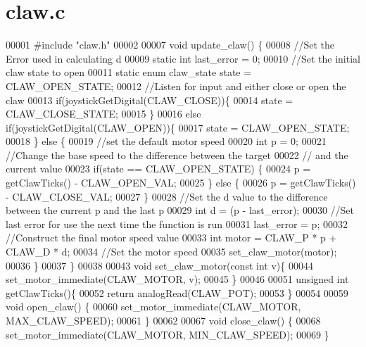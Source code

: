 \section{claw.\+c}
\label{claw_8c_source}

\begin{DoxyCode}
00001 \textcolor{preprocessor}{#include "claw.h"}
00002 
00007 \textcolor{keywordtype}{void} update_claw() \{
00008   \textcolor{comment}{//Set the Error used in calculating d}
00009   \textcolor{keyword}{static} \textcolor{keywordtype}{int} last\_error = 0;
00010   \textcolor{comment}{//Set the initial claw state to open}
00011   \textcolor{keyword}{static} \textcolor{keyword}{enum} claw_state state = CLAW_OPEN_STATE;
00012   \textcolor{comment}{//Listen for input and either close or open the claw}
00013   \textcolor{keywordflow}{if}(joystickGetDigital(CLAW_CLOSE))\{
00014     state = CLAW_CLOSE_STATE;
00015   \}
00016   \textcolor{keywordflow}{else} \textcolor{keywordflow}{if}(joystickGetDigital(CLAW_OPEN))\{
00017     state = CLAW_OPEN_STATE;
00018   \} \textcolor{keywordflow}{else} \{
00019     \textcolor{comment}{//set the default motor speed}
00020     \textcolor{keywordtype}{int} p = 0;
00021     \textcolor{comment}{//Change the base speed to the difference between the target}
00022     \textcolor{comment}{// and the current value}
00023     \textcolor{keywordflow}{if}(state == CLAW_OPEN_STATE) \{
00024       p = getClawTicks() - CLAW_OPEN_VAL;
00025     \} \textcolor{keywordflow}{else} \{
00026       p = getClawTicks() - CLAW_CLOSE_VAL;
00027     \}
00028     \textcolor{comment}{//Set the d value to the difference between the current p and the last p}
00029     \textcolor{keywordtype}{int} d = (p - last\_error);
00030     \textcolor{comment}{//Set last error for use the next time the function is run}
00031     last\_error = p;
00032     \textcolor{comment}{//Construct the final motor speed value}
00033     \textcolor{keywordtype}{int} motor = CLAW_P * p + CLAW_D * d;
00034     \textcolor{comment}{//Set the motor speed}
00035     set_claw_motor(motor);
00036   \}
00037 \}
00038 
00043 \textcolor{keywordtype}{void} set_claw_motor(\textcolor{keyword}{const} \textcolor{keywordtype}{int} v)\{
00044   set_motor_immediate(CLAW_MOTOR, v);
00045 \}
00046 
00051 \textcolor{keywordtype}{unsigned} \textcolor{keywordtype}{int} getClawTicks()\{
00052   \textcolor{keywordflow}{return} analogRead(CLAW_POT);
00053 \}
00054 
00059 \textcolor{keywordtype}{void} open_claw() \{
00060   set_motor_immediate(CLAW_MOTOR, MAX_CLAW_SPEED);
00061 \}
00062 
00067 \textcolor{keywordtype}{void} close_claw() \{
00068   set_motor_immediate(CLAW_MOTOR, MIN_CLAW_SPEED);
00069 \}
\end{DoxyCode}
